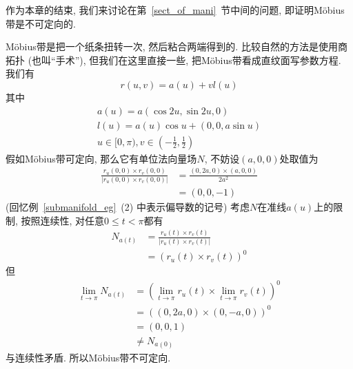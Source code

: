 作为本章的结束, 我们来讨论在第~\ref{sect_of_mani}~节中间的问题, 即证明M\"{o}bius带是不可定向的.
\begin{eg}
    M\"{o}bius带是把一个纸条扭转一次, 然后粘合两端得到的.
    比较自然的方法是使用商拓扑 (也叫``手术''), 但我们在这里直接一些, 把M\"{o}bius带看成直纹面写参数方程.
    我们有
    \[r(u,v)=a(u)+vl(u)\]
    其中
    \begin{gather*}
        a(u)=a(\cos{2u},\sin{2u},0)\\
        l(u)=a(u)\cos{u}+(0,0,a\sin{u})\\
        u\in[0,\pi),v\in\left(-\frac{1}{2},\frac{1}{2}\right)
    \end{gather*}
    假如M\"{o}bius带可定向, 那么它有单位法向量场$N$, 不妨设$(a,0,0)$处取值为
    \begin{align*}
        \frac{r_u(0,0)\times r_v(0,0)}{|r_u(0,0)\times r_v(0,0)|}&=\frac{(0,2a,0)\times(a,0,0)}{2a^2}\\
        &=(0,0,-1)
    \end{align*}
    (回忆例~\ref{submanifold_eg}~(2) 中表示偏导数的记号)
    考虑$N$在准线$a(u)$上的限制, 按照连续性, 对任意$0\leq t<\pi$都有
    \begin{align*}
        N_{a(t)}&=\frac{r_u(t)\times r_v(t)}{|r_u(t)\times r_v(t)|}\\
        &=(r_u(t)\times r_v(t))^0
    \end{align*}
    但
    \begin{align*}
        \lim_{t\to\pi}N_{a(t)}&=\left(\lim_{t\to\pi}r_u(t)\times\lim_{t\to\pi}r_v(t)\right)^0\\
        &=((0,2a,0)\times(0,-a,0))^0\\
        &=(0,0,1)\\
        &\neq N_{a(0)}
    \end{align*}
    与连续性矛盾.
    所以M\"{o}bius带不可定向.
\end{eg}